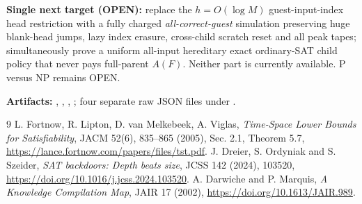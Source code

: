\documentclass[11pt]{article}
\begin{document}
\noindent\textbf{Single next target (OPEN):} replace the $h=O(\log M)$ guest-input-index head restriction with a fully charged \emph{all-correct-guest} simulation preserving huge blank-head jumps, lazy index erasure, cross-child scratch reset and all peak tapes; simultaneously prove a uniform all-input hereditary exact ordinary-SAT child policy that never pays full-parent $A(F)$. Neither part is currently available. P versus NP remains OPEN.

\noindent\textbf{Artifacts:} , , , ; four separate raw JSON files under .
\begin{thebibliography}{9}
 L. Fortnow, R. Lipton, D. van Melkebeek, A. Viglas, \emph{Time-Space Lower Bounds for Satisfiability}, JACM 52(6), 835--865 (2005), Sec. 2.1, Theorem 5.7, \url{https://lance.fortnow.com/papers/files/tst.pdf}.
 J. Dreier, S. Ordyniak and S. Szeider, \emph{SAT backdoors: Depth beats size}, JCSS 142 (2024), 103520, \url{https://doi.org/10.1016/j.jcss.2024.103520}.
 A. Darwiche and P. Marquis, \emph{A Knowledge Compilation Map}, JAIR 17 (2002), \url{https://doi.org/10.1613/JAIR.989}.
\end{thebibliography}
\end{document}
